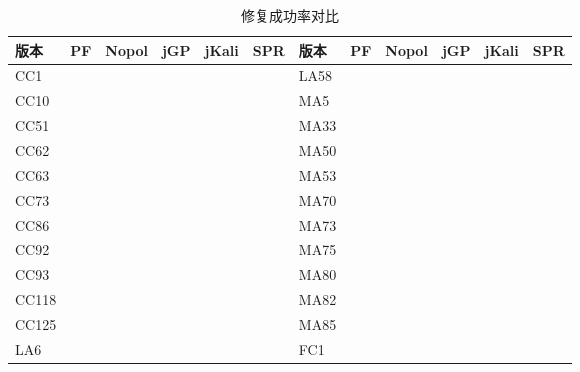 \begin{table}
	\centering
	\caption{修复成功率对比}
	\label{tab:pf_vs_others}
	\begin{tabular}{|l|l|l|l|l|l|l|l|l|l|l|l|}
		\hline
		版本    & PF          & Nopol       & jGP & jKali & SPR         & 版本   & PF          & Nopol       & jGP         & jKali       & SPR         \\ \hline
		CC1   & \textbullet &             &     &       & \textbullet & LA58 &             & \textbullet &             &             &             \\ \hline
		CC10  & \textbullet &             &     &       &             & MA5  & \textbullet &             & \textbullet &             &             \\ \hline
		CC51  & \textbullet &             &     &       & \textbullet & MA33 & \textbullet &             &             &             &             \\ \hline
		CC62  & \textbullet &             &     &       &             & MA50 &             & \textbullet & \textbullet & \textbullet &             \\ \hline
		CC63  & \textbullet &             &     &       &             & MA53 &             &             & \textbullet &             & \textbullet \\ \hline
		CC73  & \textbullet &             &     &       &             & MA70 &             &             & \textbullet &             &             \\ \hline
		CC86  & \textbullet &             &     &       &             & MA73 &             &             & \textbullet &             &             \\ \hline
		CC92  & \textbullet &             &     &       &             & MA75 & \textbullet &             &             &             &             \\ \hline
		CC93  & \textbullet &             &     &       &             & MA80 & \textbullet &             &             &             &             \\ \hline
		CC118 & \textbullet &             &     &       & \textbullet & MA82 & \textbullet &             &             &             & \textbullet \\ \hline
		CC125 & \textbullet &             &     &       & \textbullet & MA85 & \textbullet &             &             &             & \textbullet \\ \hline
		LA6   & \textbullet &             &     &       & \textbullet & FC1  & \textbullet &             &             &             & \textbullet \\ \hline

\end{tabular}
\end{table}
